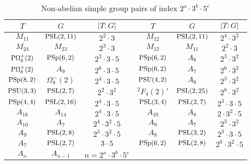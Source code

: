 \documentclass[12pt]{article}
\def\PSL{\hbox{\rm PSL}}\def\PSU{\hbox{\rm PSU}}
\def\PSp{\hbox{\rm PSp}}\def\P\GammaL{\hbox{\rm P\Gamma L}} \def\ASIL{\hbox{\rm A\Sigma L}}
\begin{document}
\begin{table}[ht]

\begin{center}

\begin{tabular}{|c|c|c||c|c|c|}

\hline
$T$        & $G$           & $|T:G|$                                   & $T$              & $G$             & $|T:G|$ \\
\hline
$M_{11}$   & $\PSL(2,11)$  & $2^2\cdot3$                              &$M_{12}$          & $\PSL(2,11)$    & $2^4\cdot3^2$   \\
\hline
$M_{24}$   & $M_{23}$      & $2^3\cdot 3$                             & $M_{12}$         & $M_{11}$        & $2^2\cdot 3$  \\
\hline
$\rm P\Omega^{+}_8(2)$  & $\PSp(6,2)$   & $2^3\cdot 3\cdot 5$       & $\PSp(6,2)$      & $A_8$      & $2^3\cdot3^2$ \\
\hline
$\rm P\Omega^{+}_8(2)$  & $A_9$      & $2^6\cdot 3\cdot 5$             & $\PSp(6,2)$      & $A_7$      & $2^6\cdot3^2$ \\
\hline
$\PSp(8,2)$   & $\Omega^{-}_8(2)$  & $2^4\cdot 3\cdot 5$               & $\PSU(4,2)$    & $A_6$     & $2^3\cdot3^2$ \\
\hline
$\PSU(3,3)$       & $\PSL(2,7)$   & $2^{2}\cdot3^2$                   & $^2F_{4}(2)'$   & $\PSL(2,25)$  & $2^8\cdot3^2$\\
\hline
$\PSp(4,4)$       & $\PSL(2,16)$   & $2^4\cdot 3\cdot 5 $           & $\PSL(3,4)$     & $\PSL(2,7)$  & $2^3\cdot3\cdot 5$\\
\hline
$A_{16}$           & $A_{14}$      & $2^4\cdot 3\cdot 5$            &$A_{10}$           & $A_{8}$      & $2\cdot 3^2\cdot 5$  \\
\hline
$A_{10}$           & $A_{7}$      & $2^4\cdot 3^2\cdot 5$           & $A_{9}$           & $A_{7}$      & $2^3\cdot 3^2$  \\
\hline
$A_{9}$           & $\PSL(2,8)$      & $2^3\cdot 3^2\cdot 5$         &$A_{8}$           & $\PSL(3,2)$      & $2^3\cdot 3\cdot 5$  \\
\hline
$A_{7}$           & $\PSL(2,7)$      & $3\cdot 5$                   &$\rm PSp(6,2)$          & $\PSL(2,8)$  & $2^6\cdot3^2\cdot 5$ \\
\hline
$A_n$          & $A_{n-1}$  & $n=2^a\cdot3^b\cdot 5^c$   &&&\\
\hline
\end{tabular}

\end{center}
\vskip -0.5cm
\caption{{Non-abelian simple group pairs of index $2^a\cdot 3^b\cdot 5^c$}}\label{table=2}
\end{table}
\end{document}
